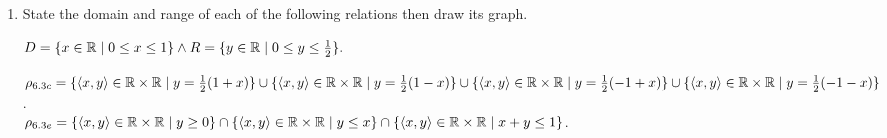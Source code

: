 \documentclass[12pt]{book}
\begin{document}
\renewcommand{\labelenumi}{1.6.\arabic{enumi}}
\begin{enumerate}

{By definition of ordered triple, $\tuple{x,y,z} = \tuple{\tuple{x,y},z} = \tuple{\tuple{u,v},w}$. Then $z=w$ and $\tuple{x,y} = \tuple{u,v}$. Then from theorem 6.1, we have $x=u$ and $y=v$.}
{$\rho = \set{1,2} \times \set{2,3,4} = \set{\tuple{1,2}, \tuple{1,3}, \tuple{1,4}, \tuple{2,2}, \tuple{2,3}, \tuple{2,4}}\\D_{\rho} = \set{1,2} \land R_{\rho} = \set{2,3,4}$}
\item State the domain and range of each of the following relations then draw its graph.
	\begin{enumerate}
	{$D = \{x\in\mathbb{R} \mid 0 \leq x \leq 1\} \land R = \{y\in\mathbb{R} \mid 0 \leq y \leq \frac{1}{2}\}.$}
	\end{enumerate}
	
{$\rho_{6.3c} = \{\langle x,y\rangle\in\mathbb{R}\times\mathbb{R} \mid y = \frac{1}{2}(1+x)\} \cup \{\langle x,y\rangle\in\mathbb{R}\times\mathbb{R} \mid y = \frac{1}{2}(1-x)\} \cup \{\langle x,y\rangle\in\mathbb{R}\times\mathbb{R} \mid y = \frac{1}{2}(-1+x)\} \cup \{\langle x,y\rangle\in\mathbb{R}\times\mathbb{R} \mid y = \frac{1}{2}(-1-x)\}$.\\ $\rho_{6.3e} = \{\langle x,y\rangle\in\mathbb{R}\times\mathbb{R} \mid y \geq 0\} \cap \{\langle x,y\rangle\in\mathbb{R}\times\mathbb{R} \mid y \leq x\} \cap \{\langle x,y\rangle\in\mathbb{R}\times\mathbb{R} \mid x + y \leq 1\}$.}


\end{enumerate}
\end{document}

